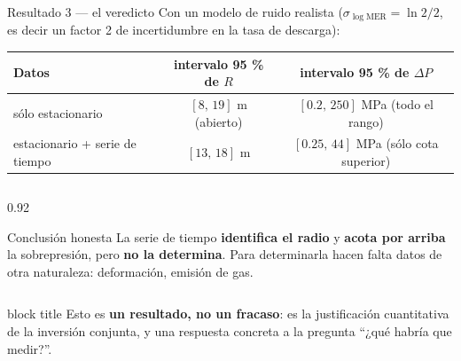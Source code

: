 \documentclass[aspectratio=169,10pt,t]{beamer}
\newcommand{\MER}{\mathrm{MER}}
\newcommand{\mensaje}[1]{%
  \vfill
  \begin{beamercolorbox}[wd=\linewidth,sep=0.4em,rounded=true]{block title}
  \footnotesize #1
  \end{beamercolorbox}}
\begin{document}
\begin{frame}{Resultado 3 — el veredicto}
Con un modelo de ruido realista ($\sigma_{\log\MER}=\ln2/2$, es decir un factor
2 de incertidumbre en la tasa de descarga):

\vspace{0.5em}
\centering\small
\begin{tabular}{@{}lcc@{}}
\toprule
\textbf{Datos} & \textbf{intervalo 95 \% de $R$} & \textbf{intervalo 95 \% de $\Delta P$} \\
\midrule
sólo estacionario & $[8,\,19]$ m (abierto) & $[0.2,\,250]$ MPa (todo el rango) \\
estacionario + serie de tiempo & $[13,\,18]$ m & $[0.25,\,44]$ MPa (sólo cota superior) \\
\bottomrule
\end{tabular}

\vspace{1.0em}
\begin{columns}[T]
\begin{column}{0.92\textwidth}
\begin{alertblock}{Conclusión honesta}
La serie de tiempo \textbf{identifica el radio} y \textbf{acota por arriba} la
sobrepresión, pero \textbf{no la determina}. Para determinarla hacen falta datos
de \alert{otra naturaleza}: deformación, emisión de gas.
\end{alertblock}
\end{column}
\end{columns}

\mensaje{Esto es \textbf{un resultado, no un fracaso}: es la justificación
cuantitativa de la inversión conjunta, y una respuesta concreta a la pregunta
``¿qué habría que medir?''.}
\end{frame}
\end{document}
